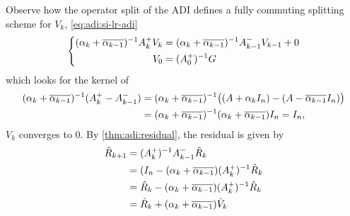 Observe how the operator split of the \ac{ADI} defines a fully commuting splitting scheme for $V_k$,
\cf \eqref{eq:adi:si-lr-adi}
\begin{equation}
\left\{
\begin{aligned}
  (\alpha_k + \conj{\alpha_{k-1}})^{-1} A_k^+ V_k &= (\alpha_k + \conj{\alpha_{k-1}})^{-1} A_{k-1}^- V_{k-1} + 0 \\
  V_0 &= (A_0^+)^{-1} G
\end{aligned}
\right.
\end{equation}
which looks for the kernel of
\begin{align*}
  (\alpha_k + \conj{\alpha_{k-1}})^{-1} (A_k^+ - A_{k-1}^-)
  &= (\alpha_k + \conj{\alpha_{k-1}})^{-1} \big( (A + \alpha_k I_n) - (A - \conj{\alpha_{k-1}} I_n) \big) \\
  &= (\alpha_k + \conj{\alpha_{k-1}})^{-1} (\alpha_k + \conj{\alpha_{k-1}}) I_n
  = I_n
  ,
\end{align*}
\ie $V_k$ converges to $0$.
By \autoref{thm:adi:residual},
the residual is given by
\begin{align*}
  \hat R_{k+1}
  &= (A_k^+)^{-1} A_{k-1}^- \hat R_k \\
  &= (I_n - (\alpha_k + \conj{\alpha_{k-1}}) (A_k^+)^{-1} \hat R_k \\
  &= \hat R_k - (\alpha_k + \conj{\alpha_{k-1}}) (A_k^+)^{-1} \hat R_k \\
  &= \hat R_k + (\alpha_k + \conj{\alpha_{k-1}}) \hat V_k
\end{align*}
